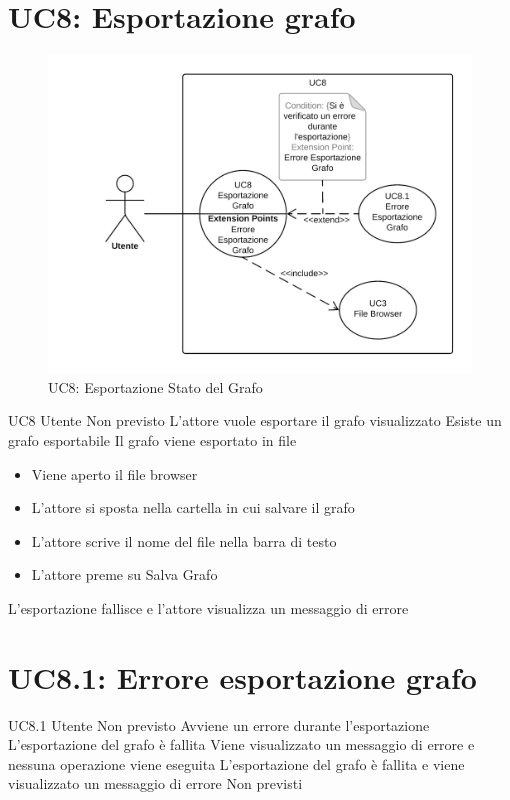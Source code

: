 \documentclass[../AnalisideiRequisiti.tex]{subfiles}
\begin{document}
\section{UC8: Esportazione grafo}
\begin{figure}[H]
	\centering
	\includegraphics[width=\textwidth]{../img/UC8.png}
	\caption{UC8: Esportazione Stato del Grafo}
\end{figure}
\UserCase
{UC8}
{Utente}
{Non previsto}
{L'attore vuole esportare il grafo visualizzato}
{Esiste un grafo esportabile}
{Il grafo viene esportato in file}
{
	\begin{itemize}
			\item{} Viene aperto il file browser 
			\item{} L'attore si sposta nella cartella in cui salvare il grafo 
			\item{} L'attore scrive il nome del file nella barra di testo
			\item{} L'attore preme su Salva Grafo
	\end{itemize}
}
{L'esportazione fallisce e l'attore visualizza un messaggio di errore }

\section{UC8.1: Errore esportazione grafo}
\UserCase
{UC8.1}
{Utente}
{Non previsto}
{Avviene un errore durante l'esportazione}
{L'esportazione del grafo è fallita}
{Viene visualizzato un messaggio di errore e nessuna operazione viene eseguita}
{L'esportazione del grafo è fallita e viene visualizzato un messaggio di errore}
{Non previsti}
\end{document}
